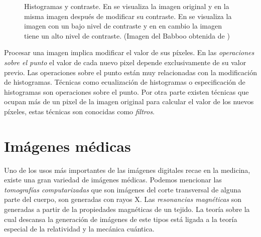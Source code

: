 \begin{figure}[h]
    \centering



  \caption[Histogramas y contraste]{Histogramas y contraste. En
  \protect{} se visualiza la imagen original y en
  \protect{} la misma imagen después de modificar su contraste. En
  \protect{} se visualiza la imagen con un bajo nivel de contraste
  y en \protect{} en cambio la imagen tiene un alto nivel de
  contraste. (Imagen del Babboo obtenida de \cite{sipi})}
  \label{fig:histograms}
\end{figure}

Procesar una imagen implica modificar el valor de sus píxeles. En las
\textit{operaciones sobre el punto} el valor de cada nuevo pixel depende
exclusivamente de su valor previo. Las operaciones sobre el punto están muy
relacionadas con la modificación de histogramas. Técnicas como ecualización de
histogramas o especificación de histogramas son operaciones sobre el punto. Por
otra parte existen técnicas que ocupan más de un pixel de la imagen original
para calcular el valor de los nuevos píxeles, estas técnicas son conocidas como
\textit{filtros}.

\section{Imágenes médicas}

Uno de los usos más importantes de las imágenes digitales recae en la medicina,
existe una gran variedad de imágenes médicas. Podemos mencionar las
\textit{tomografías computarizadas} que son imágenes del corte transversal de
alguna parte del cuerpo, son generadas con rayos X. Las \textit{resonancias
magnéticas} son generadas a partir de la propiedades magnéticas de un tejido.
La teoría sobre la cual descansa la generación de imágenes de este tipos está
ligada a la teoría especial de la relatividad y la mecánica cuántica.

